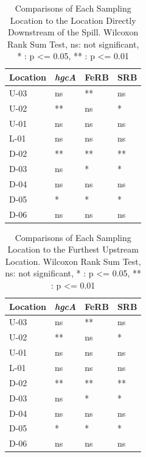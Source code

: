 \documentclass[ms, hidelinks]{uncgdissertationexp}
\theoremstyle{plain}
\theoremstyle{definition}
\theoremstyle{remark}
\begin{document}
\begin{table}[htbp]
\caption[Comparisons of Each Sampling Location to the Location Directly Downstream of the Spill.]{\label{tab:compare}Comparisons of Each Sampling Location to the Location Directly Downstream of the Spill. Wilcoxon Rank Sum Test, ns: not significant, * : p <= 0.05, ** : p <= 0.01}
\centering
\begin{tabular}{llll}
\toprule
Location & \textit{hgcA} & FeRB & SRB\\
\midrule
U-03 & ns & ** & ns\\
U-02 & ** & ns & *\\
U-01 & ns & ns & ns\\
L-01 & ns & ns & ns\\
D-02 & ** & ** & **\\
D-03 & ns & * & *\\
D-04 & ns & ns & ns\\
D-05 & * & * & *\\
D-06 & ns & ns & ns\\
\bottomrule
\end{tabular}
\end{table}
\begin{table}[htbp]
\caption[Comparisons of Each Sampling Location to the Furthest Upstream Location.]{\label{tab:compareU}Comparisons of Each Sampling Location to the Furthest Upstream Location. Wilcoxon Rank Sum Test, ns: not significant, * : p <= 0.05, ** : p <= 0.01}
\centering
\begin{tabular}{llll}
\toprule
Location & \textit{hgcA} & FeRB & SRB\\
\midrule
U-03 & ns & ** & ns\\
U-02 & ** & ns & *\\
U-01 & ns & ns & ns\\
L-01 & ns & ns & ns\\
D-02 & ** & ** & **\\
D-03 & ns & * & *\\
D-04 & ns & ns & ns\\
D-05 & * & * & *\\
D-06 & ns & ns & ns\\
\bottomrule
\end{tabular}
\end{table}
\clearpage
\end{document}

